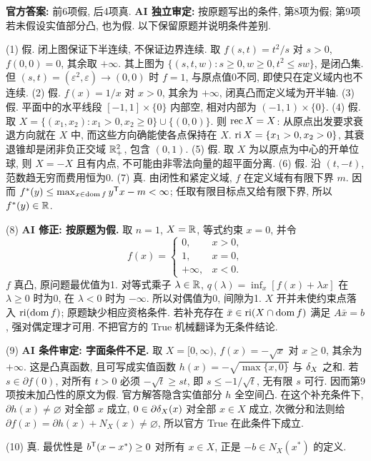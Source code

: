 \begin{solution}
\textbf{官方答案:} 前6项假, 后4项真. \textbf{AI 独立审定:} 按原题写出的条件, 第8项为假; 第9项若未假设实值部分凸, 也为假. 以下保留原题并说明条件差别.

(1) 假. 闭上图保证下半连续, 不保证边界连续. 取 $f(s,t)=t^2/s$ 对 $s>0$, $f(0,0)=0$, 其余取 $+\infty$. 其上图为 $\{(s,t,w):s\ge0,w\ge0,t^2\le sw\}$, 是闭凸集. 但 $(s,t)=(\varepsilon^2,\varepsilon)\to(0,0)$ 时 $f=1$, 与原点值0不同, 即使只在定义域内也不连续.
(2) 假. $f(x)=1/x$ 对 $x>0$, 其余为 $+\infty$, 闭真凸而定义域为开半轴.
(3) 假. 平面中的水平线段 $[-1,1]\times\{0\}$ 内部空, 相对内部为 $(-1,1)\times\{0\}$.
(4) 假. 取 $X=\{(x_1,x_2):x_1>0,x_2\ge0\}\cup\{(0,0)\}$. 则 $\operatorname{rec} X=X$: 从原点出发要求衰退方向就在 $X$ 中, 而这些方向确能使各点保持在 $X$. $\operatorname{ri} X=\{x_1>0,x_2>0\}$, 其衰退锥却是闭非负正交域 $\mathbb R_+^2$, 包含 $(0,1)$.
(5) 假. 取 $X$ 为以原点为中心的开单位球, 则 $X=-X$ 且有内点, 不可能由非零法向量的超平面分离.
(6) 假. 沿 $(t,-t)$, 范数趋无穷而费用恒为0.
(7) 真. 由闭性和紧定义域, $f$ 在定义域有有限下界 $m$. 因而
$f^*(y)\le\max_{x\in\operatorname{dom} f}y^{\mathsf T} x-m<\infty$; 任取有限目标点又给有限下界, 所以 $f^*(y)\in\mathbb R$.

(8) \textbf{AI 修正: 按原题为假.} 取 $n=1$, $X=\mathbb R$, 等式约束 $x=0$, 并令
\[
f(x)=\begin{cases}0,&x>0,\\1,&x=0,\\+\infty,&x<0.\end{cases}
\]
$f$ 真凸, 原问题最优值为1. 对等式乘子 $\lambda\in\mathbb R$, $q(\lambda)=\inf_x[f(x)+\lambda x]$ 在 $\lambda\ge0$ 时为0, 在 $\lambda<0$ 时为 $-\infty$. 所以对偶值为0, 间隙为1. $X$ 开并未使约束点落入 $\operatorname{ri}(\operatorname{dom} f)$; 原题缺少相应资格条件. 若补充存在 $\bar x\in\operatorname{ri}(X\cap\operatorname{dom} f)$ 满足 $A\bar x=b$, 强对偶定理才可用. 不把官方的 True 机械翻译为无条件结论.

(9) \textbf{AI 条件审定: 字面条件不足.} 取 $X=[0,\infty)$,
$f(x)=-\sqrt x$ 对 $x\ge0$, 其余为 $+\infty$. 这是凸真函数, 且可写成实值函数 $h(x)=-\sqrt{\max\{x,0\}}$ 与 $\delta_{X}$ 之和. 若 $s\in\partial f(0)$, 对所有 $t>0$ 必须 $-\sqrt t\ge st$, 即 $s\le-1/\sqrt t$, 无有限 $s$ 可行. 因而第9项按未加凸性的原文为假.
官方解答隐含实值部分 $h$ 全空间凸. 在这个补充条件下, $\partial h(x)\ne\varnothing$ 对全部 $x$ 成立, $0\in\partial\delta_{X}(x)$ 对全部 $x\in X$ 成立, 次微分和法则给 $\partial f(x)=\partial h(x)+N_X(x)\ne\varnothing$, 所以官方 True 在此条件下成立.

(10) 真. 最优性是 $b^{\mathsf T}(x-x^*)\ge0$ 对所有 $x\in X$, 正是 $-b\in N_X(x^*)$ 的定义.
\end{solution}

